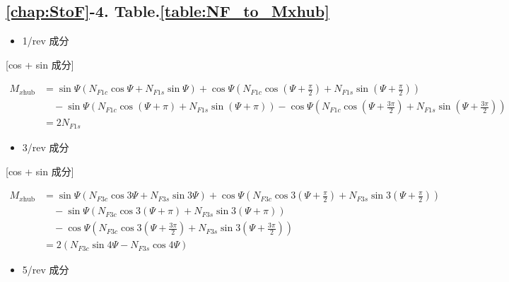     \subsection*{\ref{chap:StoF}-4. Table.\ref{table:NF_to_Mxhub}}

    \begin{itemize}
    \item 1/rev 成分
    \end{itemize}

    [cos + sin 成分]

    \begin{align}
    M_{x\mathrm{hub}}
    &= \sin\Psi
    \left(
    N_{F1c}\cos\Psi + N_{F1s}\sin\Psi
    \right)
    + \cos\Psi
    \left(
    N_{F1c}\cos\left(\Psi + \frac{\pi}{2}\right)
    + N_{F1s}\sin\left(\Psi + \frac{\pi}{2}\right)
    \right) \nonumber \\
    &\quad
    - \sin\Psi
    \left(
    N_{F1c}\cos(\Psi + \pi) + N_{F1s}\sin(\Psi + \pi)
    \right)
    - \cos\Psi
    \left(
    N_{F1c}\cos\left(\Psi + \frac{3\pi}{2}\right)
    + N_{F1s}\sin\left(\Psi + \frac{3\pi}{2}\right)
    \right) \nonumber \\
    &= 2 N_{F1s}
    \end{align}

    \begin{itemize}
    \item 3/rev 成分
    \end{itemize}

    [cos + sin 成分]

    \begin{align}
    M_{x\mathrm{hub}}
    &= \sin\Psi
    \left(
    N_{F3c}\cos 3\Psi + N_{F3s}\sin 3\Psi
    \right)
    + \cos\Psi
    \left(
    N_{F3c}\cos 3\left(\Psi + \frac{\pi}{2}\right)
    + N_{F3s}\sin 3\left(\Psi + \frac{\pi}{2}\right)
    \right) \nonumber \\
    &\quad
    - \sin\Psi
    \left(
    N_{F3c}\cos 3(\Psi + \pi) + N_{F3s}\sin 3(\Psi + \pi)
    \right)  \nonumber \\
    &\quad
    - \cos\Psi
    \left(
    N_{F3c}\cos 3\left(\Psi + \frac{3\pi}{2}\right)
    + N_{F3s}\sin 3\left(\Psi + \frac{3\pi}{2}\right)
    \right) \nonumber \\
    &= 2\left(
    N_{F3c}\sin 4\Psi - N_{F3s}\cos 4\Psi
    \right)
    \end{align}

    \begin{itemize}
    \item 5/rev 成分
    \end{itemize}

